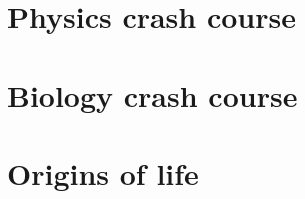 \documentclass[DIV=calc, paper=a4, fontsize=12pt]{scrartcl}	 %
\begin{document}

\section{Physics crash course}

\begin{multicols}{2}









\end{multicols} \noindent\makebox[\linewidth]{\rule{\textwidth}{0.4pt}}


\section{Biology crash course}

\begin{multicols}{2}





\end{multicols} \noindent\makebox[\linewidth]{\rule{\textwidth}{0.4pt}}


\section{Origins of life}

\begin{multicols}{2}



\end{multicols} \noindent\makebox[\linewidth]{\rule{\textwidth}{0.4pt}}

\end{document}
